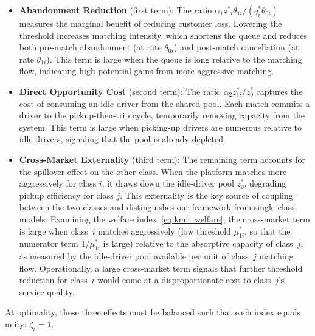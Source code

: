 \begin{itemize}
\item \textbf{Abandonment Reduction} (first term):
The ratio $\alpha_1 z_{1i}^*\theta_{1i}/(q_i^*\theta_{0i})$ measures the marginal benefit of reducing customer loss.
Lowering the threshold increases matching intensity, which shortens the queue and reduces both pre-match abandonment (at rate $\theta_{0i}$) and post-match cancellation (at rate $\theta_{1i}$).
This term is large when the queue is long relative to the matching flow, indicating high potential gains from more aggressive matching.

\item \textbf{Direct Opportunity Cost} (second term):
The ratio $\alpha_2 z_{1i}^*/z_0^*$ captures the cost of consuming an idle driver from the shared pool.
Each match commits a driver to the pickup-then-trip cycle, temporarily removing capacity from the system.
This term is large when picking-up drivers are numerous relative to idle drivers, signaling that the pool is already depleted.

\item \textbf{Cross-Market Externality} (third term):
The remaining term accounts for the spillover effect on the other class.
When the platform matches more aggressively for class $i$, it draws down the idle-driver pool $z_0^*$, degrading pickup efficiency for class $j$.
This externality is the key source of coupling between the two classes and distinguishes our framework from single-class models.
Examining the welfare index~\eqref{eq:kmi_welfare}, the cross-market term is large when class~$i$ matches aggressively (low threshold $\mu_{1i}^*$, so that the numerator term $1/\mu_{1i}^*$ is large) relative to the absorptive capacity of class~$j$, as measured by the idle-driver pool available per unit of class~$j$ matching flow.
Operationally, a large cross-market term signals that further threshold reduction for class~$i$ would come at a disproportionate cost to class~$j$'s service quality.
\end{itemize}

At optimality, these three effects must be balanced such that each index equals unity: $\zeta_i = 1$.

